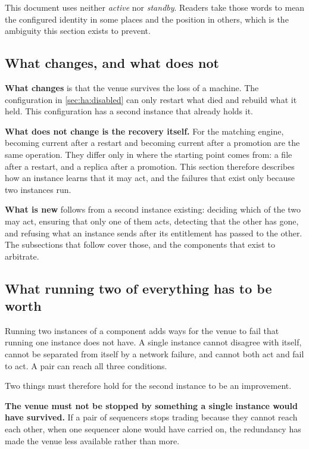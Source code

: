 This document uses neither \emph{active} nor \emph{standby}. Readers take those
words to mean the configured identity in some places and the position in others,
which is the ambiguity this section exists to prevent.

\subsection{What changes, and what does not}
\label{sec:ha:enabled:what_changes}

\textbf{What changes} is that the venue survives the loss of a machine. The
configuration in \cref{sec:ha:disabled} can only restart what died and rebuild
what it held. This configuration has a second instance that already holds it.

\textbf{What does not change is the recovery itself.} For the matching engine,
becoming current after a restart and becoming current after a promotion are the
same operation. They differ only in where the starting point comes from: a file
after a restart, and a replica after a promotion. This section therefore
describes how an instance learns that it may act, and the failures that exist
only because two instances run.

\textbf{What is new} follows from a second instance existing: deciding which of
the two may act, ensuring that only one of them acts, detecting that the other
has gone, and refusing what an instance sends after its entitlement has passed to
the other. The subsections that follow cover those, and the components that exist
to arbitrate.

\subsection{What running two of everything has to be worth}
\label{sec:ha:enabled:worth}

Running two instances of a component adds ways for the venue to fail that running
one instance does not have. A single instance cannot disagree with itself, cannot
be separated from itself by a network failure, and cannot both act and fail to
act. A pair can reach all three conditions.

Two things must therefore hold for the second instance to be an improvement.

\textbf{The venue must not be stopped by something a single instance would have
survived.} If a pair of sequencers stops trading because they cannot reach each
other, when one sequencer alone would have carried on, the redundancy has made
the venue less available rather than more.

